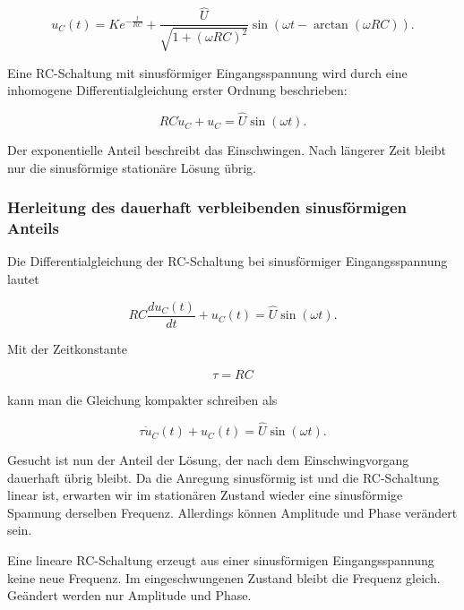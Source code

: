 \begin{equation}
	u_C(t)
	=
	K e^{-\frac{t}{RC}}
	+
	\frac{\hat{U}}{\sqrt{1+(\omega RC)^2}}
	\sin\left(
	\omega t
	-
	\arctan(\omega RC)
	\right).
	\label{eq:rc-gesamte-loesung}
\end{equation}

\begin{DidacticBox}[Merksatz]
	\label{box:rc-sinus-merksatz}
	Eine RC-Schaltung mit sinusförmiger Eingangsspannung wird durch eine
	inhomogene Differentialgleichung erster Ordnung beschrieben:
	
	\[
	RC\dot{u}_C + u_C = \hat{U}\sin(\omega t).
	\]
	
	Der exponentielle Anteil beschreibt das Einschwingen. Nach längerer Zeit
	bleibt nur die sinusförmige stationäre Lösung übrig.
\end{DidacticBox}


\subsubsection{Herleitung des dauerhaft verbleibenden sinusförmigen Anteils}
\label{subsubsec:rc-herleitung-stationaerer-sinusanteil}

Die Differentialgleichung der RC-Schaltung bei sinusförmiger Eingangsspannung
lautet

\begin{equation}
	RC \frac{du_C(t)}{dt} + u_C(t)
	=
	\hat{U}\sin(\omega t).
	\label{eq:rc-dgl-sinus-stationaer-ausgangspunkt}
\end{equation}

Mit der Zeitkonstante

\begin{equation}
	\tau = RC
	\label{eq:rc-zeitkonstante-stationaer}
\end{equation}

kann man die Gleichung kompakter schreiben als

\begin{equation}
	\tau \dot{u}_C(t) + u_C(t)
	=
	\hat{U}\sin(\omega t).
	\label{eq:rc-dgl-sinus-tau-form}
\end{equation}

Gesucht ist nun der Anteil der Lösung, der nach dem Einschwingvorgang dauerhaft
übrig bleibt. Da die Anregung sinusförmig ist und die RC-Schaltung linear ist,
erwarten wir im stationären Zustand wieder eine sinusförmige Spannung derselben
Frequenz. Allerdings können Amplitude und Phase verändert sein.

\begin{DidacticBox}
	\label{box:rc-grundidee-stationaerer-ansatz}
	Eine lineare RC-Schaltung erzeugt aus einer sinusförmigen Eingangsspannung
	keine neue Frequenz. Im eingeschwungenen Zustand bleibt die Frequenz gleich.
	Geändert werden nur Amplitude und Phase.
\end{DidacticBox}

